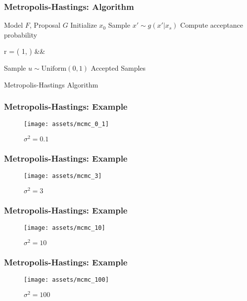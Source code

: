 \documentclass{beamer}
\begin{document}
\begin{frame}
\frametitle{Metropolis-Hastings: Algorithm}
  \begin{algorithm}[H]
  \scriptsize
  \begin{algorithmic}[1]
    \REQUIRE Model $F$, Proposal $G$
    \STATE Initialize $x_0$
      \STATE Sample $x' \sim g(x'|x_s)$
      \STATE Compute acceptance probability
        \begin{flalign*}
          r = \min\left( 1, \;   \right) &&
        \end{flalign*}
      \STATE Sample $u \sim \text{Uniform}(0, 1)$
      \ELSE
      \ENDIF
    \ENDFOR
    \ENSURE Accepted Samples
  \end{algorithmic}
  \caption{Metropolis-Hastings Algorithm}
  \end{algorithm}
\end{frame}


\begin{frame}
  \frametitle{Metropolis-Hastings: Example}
  \begin{figure}
    \centering
    \texttt{[image: assets/mcmc\_0\_1]}
    \caption{$\sigma^2 = 0.1$}
  \end{figure}
\end{frame}

\begin{frame}
  \frametitle{Metropolis-Hastings: Example}
  \begin{figure}
    \centering
    \texttt{[image: assets/mcmc\_3]}
    \caption{$\sigma^2 = 3$}
  \end{figure}
\end{frame}

\begin{frame}
  \frametitle{Metropolis-Hastings: Example}
  \begin{figure}
    \centering
    \texttt{[image: assets/mcmc\_10]}
    \caption{$\sigma^2 = 10$}
  \end{figure}
\end{frame}

\begin{frame}
  \frametitle{Metropolis-Hastings: Example}
  \begin{figure}
    \centering
    \texttt{[image: assets/mcmc\_100]}
    \caption{$\sigma^2 = 100$}
  \end{figure}
\end{frame}
\end{document}
